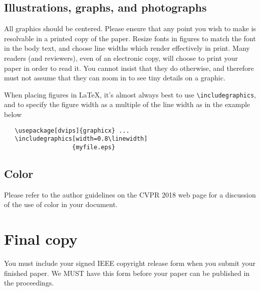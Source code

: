 \documentclass[10pt,twocolumn,letterpaper]{article}
\begin{document}
\subsection{Illustrations, graphs, and photographs}

All graphics should be centered.  Please ensure that any point you wish to
make is resolvable in a printed copy of the paper.  Resize fonts in figures
to match the font in the body text, and choose line widths which render
effectively in print.  Many readers (and reviewers), even of an electronic
copy, will choose to print your paper in order to read it.  You cannot
insist that they do otherwise, and therefore must not assume that they can
zoom in to see tiny details on a graphic.

When placing figures in \LaTeX, it's almost always best to use
\verb+\includegraphics+, and to specify the  figure width as a multiple of
the line width as in the example below
{\small\begin{verbatim}
   \usepackage[dvips]{graphicx} ...
   \includegraphics[width=0.8\linewidth]
                   {myfile.eps}
\end{verbatim}
}


\subsection{Color}

Please refer to the author guidelines on the CVPR 2018 web page for a discussion
of the use of color in your document.

\section{Final copy}

You must include your signed IEEE copyright release form when you submit
your finished paper. We MUST have this form before your paper can be
published in the proceedings.


{\small


}
\end{document}

